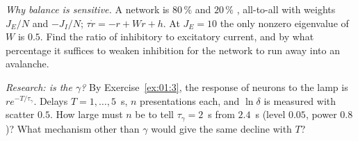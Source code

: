 \begin{exercise}[\lvlB]
\label{ex:01:6}
\emph{Why balance is sensitive.} A network is $80\,\%$  and $20\,\%$ , all-to-all with weights $J_E/N$ and $-J_I/N$; $\tau\dot r=-r+Wr+h$. At $J_E=10$ the only nonzero eigenvalue of $W$ is $0.5$. Find the ratio of inhibitory to excitatory current, and by what percentage it suffices to weaken inhibition for the network to run away into an avalanche.
\end{exercise}

\begin{exercise}[\lvlC]
\label{ex:01:7}
\emph{Research: is  the $\gamma$?} By Exercise~\ref{ex:01:3}, the response of  neurons to the lamp is $re^{-T/\tau_\gamma}$. Delays $T=1,\dots,5$~s, $n$ presentations each, and $\ln\delta$ is measured with scatter $0.5$. How large must $n$ be to tell $\tau_\gamma=2$~s from $2.4$~s (level $0.05$, power $0.8$)? What mechanism other than $\gamma$ would give the same decline with $T$?
\end{exercise}
